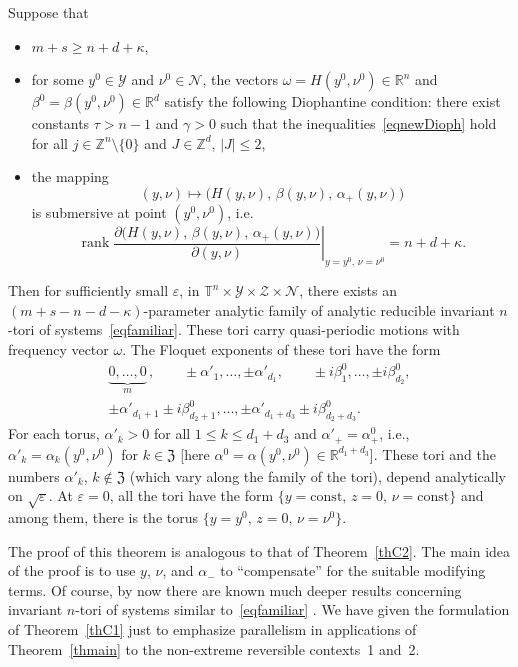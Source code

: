 \documentclass[12pt,reqno]{amsart}
\theoremstyle{definition}
\begin{document}
\begin{thm}\label{thC1}
Suppose that
\begin{itemize}
\item $m+s{\geqslant} n+d+\kappa$,
\item for some $y^0\in{\mathcal Y}$ and $\nu^0\in{\mathcal N}$, the vectors
$\omega=H(y^0,\nu^0)\in{\mathbb R}^n$ and $\beta^0=\beta(y^0,\nu^0)\in{\mathbb R}^d$ satisfy
the following Diophantine condition: there exist constants $\tau>n-1$ and
$\gamma>0$ such that the inequalities~\eqref{eqnewDioph} hold for all
$j\in{\mathbb Z}^n\setminus\{0\}$ and $J\in{\mathbb Z}^d$, $|J|{\leqslant} 2$,
\item the mapping
\[
(y,\nu)\mapsto\bigl( H(y,\nu), \, \beta(y,\nu), \, \alpha_+(y,\nu) \bigr)
\]
is submersive at point $(y^0,\nu^0)$, i.e.
\[
\left. \operatorname{rank}\frac{
\partial\bigl( H(y,\nu), \, \beta(y,\nu), \, \alpha_+(y,\nu) \bigr)
}{\partial(y,\nu)} \right|_{y=y^0, \, \nu=\nu^0} = n+d+\kappa.
\]
\end{itemize}
Then for sufficiently small ${\varepsilon}$, in ${\mathbb T}^n\times{\mathcal Y}\times{\mathcal Z}\times{\mathcal N}$,
there exists an $(m+s-n-d-\kappa)$-parameter analytic family of analytic
reducible invariant $n$-tori of systems~\eqref{eqfamiliar}. These tori carry
quasi-periodic motions with frequency vector $\omega$. The Floquet exponents
of these tori have the form
\begin{gather*}
\underbrace{0,\ldots,0}_m\,, \qquad
\pm\alpha'_1,\ldots,\pm\alpha'_{d_1}, \qquad
\pm i\beta^0_1,\ldots,\pm i\beta^0_{d_2}, \\
\pm\alpha'_{d_1+1}\pm i\beta^0_{d_2+1},\ldots,
\pm\alpha'_{d_1+d_3}\pm i\beta^0_{d_2+d_3}.
\end{gather*}
For each torus, $\alpha'_k>0$ for all $1{\leqslant} k{\leqslant} d_1+d_3$ and
$\alpha'_+=\alpha^0_+$, i.e., $\alpha'_k=\alpha_k(y^0,\nu^0)$ for $k\in{\mathfrak Z}$
\textup{[}here $\alpha^0=\alpha(y^0,\nu^0)\in{\mathbb R}^{d_1+d_3}$\textup{]}. These
tori and the numbers $\alpha'_k$, $k\notin{\mathfrak Z}$ \textup{(}which vary along the
family of the tori\textup{)}, depend analytically on ${\sqrt{\varepsilon}}$. At ${\varepsilon}=0$,
all the tori have the form $\{y={\mathrm{const}}, \, z=0, \, \nu={\mathrm{const}}\}$ and among
them, there is the torus $\{y=y^0, \, z=0, \, \nu=\nu^0\}$.
\end{thm}

The proof of this theorem is analogous to that of Theorem~\ref{thC2}. The main
idea of the proof is to use $y$, $\nu$, and $\alpha_-$ to ``compensate'' for
the suitable modifying terms. Of course, by now there are known much deeper
results concerning invariant $n$-tori of systems similar to~\eqref{eqfamiliar}
\cite{B91,BCHV09,BHN07,BH95,BHS96Gro,BHS96LNM,L01,Sch87,S95Cha,S98,S06,S07DCDS,S07Stek,WX09,WXZ10,WZX11,W01,X04,Z08}. We have given the formulation
of Theorem~\ref{thC1} just to emphasize parallelism in applications of
Theorem~\ref{thmain} to the non-extreme reversible contexts~1 and~2.
\end{document}
